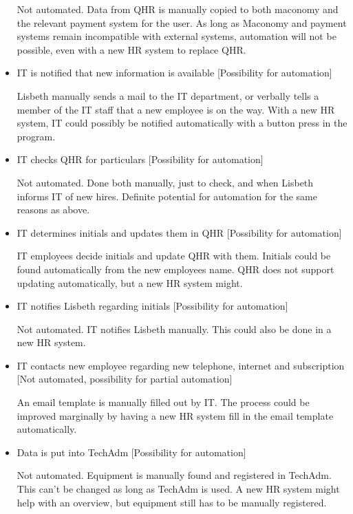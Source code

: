 \begin{itemize}
		Not automated. Data from QHR is manually copied to both maconomy and the relevant payment system for the user.
		As long as Maconomy and payment systems remain incompatible with external systems, automation will not be possible, even with a new HR system to replace QHR.
	
	\item{IT is notified that new information is available} [Possibility for automation]
	
		Lisbeth manually sends a mail to the IT department, or verbally tells a member of the IT staff that a new employee is on the way.
		With a new HR system, IT could possibly be notified automatically with a button press in the program.		
	
	\item{IT checks QHR for particulars} [Possibility for automation]
	
		Not automated. Done both manually, just to check, and when Lisbeth informs IT of new hires.
		Definite potential for automation for the same reasons as above.
	
	\item{IT determines initials and updates them in QHR} [Possibility for automation]
	
		IT employees decide initials and update QHR with them. Initials could be found automatically from the new employees name. QHR does not support updating automatically, but a new HR system might.
	
	\item{IT notifies Lisbeth regarding initials} [Possibility for automation]
	
		Not automated. IT notifies Lisbeth manually. This could also be done in a new HR system.
	
	\item{IT contacts new employee regarding new telephone, internet and subscription} [Not automated, possibility for partial automation]
	
		An email template is manually filled out by IT. The process could be improved marginally by having a new HR system fill in the email template automatically.
	
	\item{Data is put into TechAdm} [Possibility for automation]
	
		Not automated. Equipment is manually found and registered in TechAdm.
		This can't be changed as long as TechAdm is used. A new HR system might help with an overview, but equipment still has to be manually registered.
	

\end{itemize}
